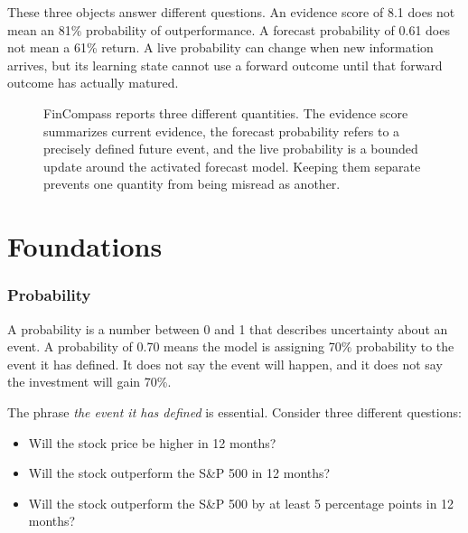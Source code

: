 \documentclass[11pt]{article}
\begin{document}
These three objects answer different questions. An evidence score of 8.1 does not mean an 81\% probability of outperformance. A forecast probability of 0.61 does not mean a 61\% return. A live probability can change when new information arrives, but its learning state cannot use a forward outcome until that forward outcome has actually matured.

\begin{figure}[tbp]
\centering
{}
\caption{FinCompass reports three different quantities. The evidence score summarizes current evidence, the forecast probability refers to a precisely defined future event, and the live probability is a bounded update around the activated forecast model. Keeping them separate prevents one quantity from being misread as another.}
\end{figure}

\part{Foundations}

\section{Probability}

A probability is a number between 0 and 1 that describes uncertainty about an event. A probability of 0.70 means the model is assigning 70\% probability to the event it has defined. It does not say the event will happen, and it does not say the investment will gain 70\%.

The phrase \emph{the event it has defined} is essential. Consider three different questions:

\begin{itemize}
\item Will the stock price be higher in 12 months?
\item Will the stock outperform the S\&P 500 in 12 months?
\item Will the stock outperform the S\&P 500 by at least 5 percentage points in 12 months?
\end{itemize}
\end{document}

